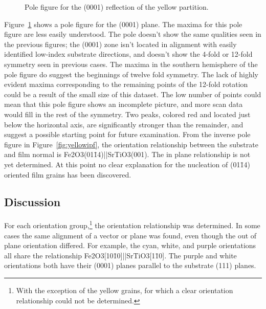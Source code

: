 \documentclass[12pt,%
              twoside,
               letterpaper]{uiothesis}
\begin{document}
\begin{figure}
\begin{center}
\caption[(0001) pole figure for yellow grains]{%
	Pole figure for the (0001) reflection of the yellow partition.}
\label{fig:yellow0001pole}
\end{center}
\end{figure}
Figure~\ref{fig:yellow0001pole} shows a pole figure for the (0001) plane. The maxima for this
pole figure are less easily understood.  The pole doesn't show the same qualities seen in
the previous figures; the (0001) zone isn't located in alignment with easily identified
low-index substrate directions, and doesn't show the 4-fold or 12-fold symmetry seen in
previous cases. The maxima in the southern hemisphere of the pole figure do suggest the
beginnings of twelve fold symmetry. The lack of highly evident maxima corresponding to the
remaining points of the 12-fold rotation could be a result of the small size of this
dataset. The low number of points could mean that this pole figure shows an incomplete
picture, and more scan data would fill in the rest of the symmetry. Two peaks, colored red 
and located just below the horizontal axis, are significantly stronger than the remainder, 
and suggest a possible starting point for future examination. From the inverse pole figure 
in Figure~\ref{fig:yellowipf}, the orientation relationship 
between the substrate and film normal is Fe2O3(01\={1}4)||SrTiO3(001). The in
plane relationship is not yet determined. At this point no clear explanation for the 
nucleation of (01\={1}4) oriented film grains has been discovered.


\subsection{Discussion}
\label{subsec:single.growth.discussion}

For each orientation group,\footnote{With the exception of the yellow grains, for which a
clear orientation relationship could not be determined.} the orientation relationship was
determined. In some cases the same alignment of a vector or plane was found, even though
the out of plane orientation differed. For example, the cyan, white, and purple
orientations all share the relationship Fe2O3[10\={1}0]||SrTiO3[1\={1}0]. The
purple and white orientations both have their (0001) planes parallel to the substrate
(111) planes.
\end{document}

